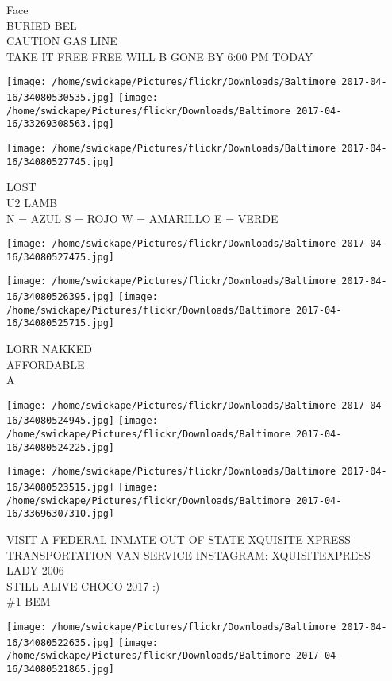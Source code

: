 \documentclass[10pt,letterpaper]{article}
\begin{document}
Face\\
BURIED BEL\\
CAUTION GAS LINE\\
TAKE IT FREE FREE WILL B GONE BY 6:00 PM TODAY
\pagebreak

\texttt{[image: /home/swickape/Pictures/flickr/Downloads/Baltimore 2017-04-16/34080530535.jpg]}
\texttt{[image: /home/swickape/Pictures/flickr/Downloads/Baltimore 2017-04-16/33269308563.jpg]}

\texttt{[image: /home/swickape/Pictures/flickr/Downloads/Baltimore 2017-04-16/34080527745.jpg]}

LOST\\
U2 LAMB\\
N = AZUL S = ROJO W = AMARILLO E = VERDE
\pagebreak

\texttt{[image: /home/swickape/Pictures/flickr/Downloads/Baltimore 2017-04-16/34080527475.jpg]}

\vspace{0.25in}
\texttt{[image: /home/swickape/Pictures/flickr/Downloads/Baltimore 2017-04-16/34080526395.jpg]}
\texttt{[image: /home/swickape/Pictures/flickr/Downloads/Baltimore 2017-04-16/34080525715.jpg]}

LORR NAKKED\\
AFFORDABLE\\
A
\pagebreak

\texttt{[image: /home/swickape/Pictures/flickr/Downloads/Baltimore 2017-04-16/34080524945.jpg]}
\texttt{[image: /home/swickape/Pictures/flickr/Downloads/Baltimore 2017-04-16/34080524225.jpg]}

\texttt{[image: /home/swickape/Pictures/flickr/Downloads/Baltimore 2017-04-16/34080523515.jpg]}
\texttt{[image: /home/swickape/Pictures/flickr/Downloads/Baltimore 2017-04-16/33696307310.jpg]}

VISIT A FEDERAL INMATE OUT OF STATE XQUISITE XPRESS TRANSPORTATION VAN SERVICE  INSTAGRAM: XQUISITEXPRESS\\
LADY 2006\\
STILL ALIVE CHOCO 2017 :)\\
\#1 BEM
\pagebreak

\texttt{[image: /home/swickape/Pictures/flickr/Downloads/Baltimore 2017-04-16/34080522635.jpg]}
\texttt{[image: /home/swickape/Pictures/flickr/Downloads/Baltimore 2017-04-16/34080521865.jpg]}
\end{document}
